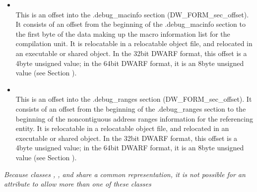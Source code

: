 \begin{itemize}
\item {} \\
This is an offset into the .debug\_macinfo section
(DW\-\_FORM\-\_sec\-\_offset). It consists of an offset from the
beginning of the .debug\_macinfo section to the first byte of
the data making up the macro information list for the compilation
unit. 
It is relocatable in a relocatable object file, and
relocated in an executable or shared object. In the 32\dash bit
DWARF format, this offset is a 4\dash byte unsigned value;
in the 64\dash bit DWARF format, it is an 8\dash byte unsigned value
(see Section ).

\item {} \\
This is an offset into the .debug\_ranges section
(DW\-\_FORM\-\_sec\-\_offset). 
It consists of an
offset from the beginning of the .debug\_ranges section
to the beginning of the non\dash contiguous address ranges
information for the referencing entity.  
It is relocatable in
a relocatable object file, and relocated in an executable or
shared object. In the 32\dash bit DWARF format, this offset
is a 4\dash byte unsigned value; in the 64\dash bit DWARF
format, it is an 8\dash byte unsigned value (see Section
).
\end{itemize}

\textit{Because classes , ,  and 
share a common representation, it is not possible for an
attribute to allow more than one of these classes}


